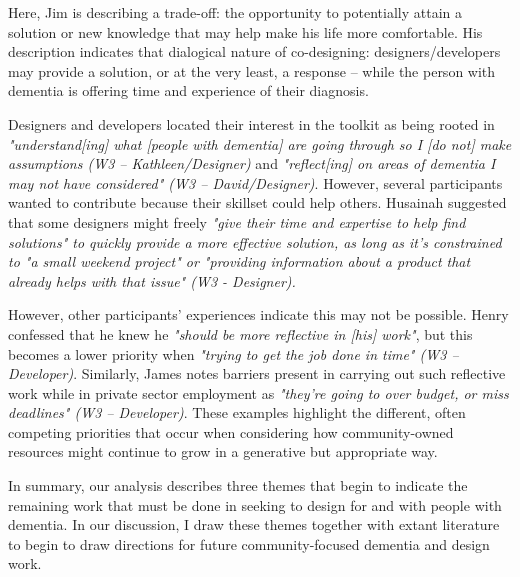 Here, Jim is describing a trade-off: the opportunity to potentially attain a solution or new knowledge that may help make his life more comfortable. His description indicates that dialogical nature of co-designing: designers/developers may provide a solution, or at the very least, a response – while the person with dementia is offering time and experience of their diagnosis. 

Designers and developers located their interest in the toolkit as being rooted in \textit{"understand[ing] what [people with dementia] are going through so I [do not] make assumptions (W3 – Kathleen/Designer)} and \textit{"reflect[ing] on areas of dementia I may not have considered" (W3 – David/Designer)}. However, several participants wanted to contribute because their skillset could help others. Husainah suggested that some designers might freely \textit{"give their time and expertise to help find solutions" to quickly provide a more effective solution, as long as it’s constrained to "a small weekend project" or "providing information about a product that already helps with that issue" (W3 - Designer).}

However, other participants’ experiences indicate this may not be possible. Henry confessed that he knew he \textit{"should be more reflective in [his] work"}, but this becomes a lower priority when \textit{"trying to get the job done in time" (W3 – Developer)}. Similarly, James notes barriers present in carrying out such reflective work while in private sector employment as \textit{"they're going to over budget, or miss deadlines" (W3 – Developer)}. These examples highlight the different, often competing priorities that occur when considering how community-owned resources might continue to grow in a generative but appropriate way.

In summary, our analysis describes three themes that begin to indicate the remaining work that must be done in seeking to design for and with people with dementia. In our discussion, I draw these themes together with extant literature to begin to draw directions for future community-focused dementia and design work.
